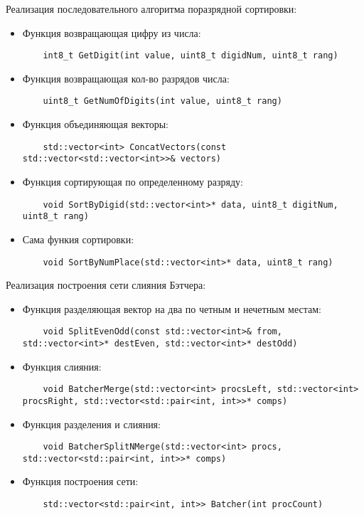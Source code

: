 \documentclass{report}
\begin{document}
Реализация последовательного алгоритма поразрядной сортировки:
\begin{itemize}
\item Функция возвращающая цифру из числа:
\begin{lstlisting}
	int8_t GetDigit(int value, uint8_t digidNum, uint8_t rang)
\end{lstlisting}
\item Функция возвращающая кол-во разрядов числа:
\begin{lstlisting}
	uint8_t GetNumOfDigits(int value, uint8_t rang)
\end{lstlisting}
\item Функция объединяющая векторы:
\begin{lstlisting}
	std::vector<int> ConcatVectors(const std::vector<std::vector<int>>& vectors)
\end{lstlisting}
\item Функция сортирующая по определенному разряду:
\begin{lstlisting}
	void SortByDigid(std::vector<int>* data, uint8_t digitNum, uint8_t rang)
\end{lstlisting}
\item Сама функия сортировки:
\begin{lstlisting}
	void SortByNumPlace(std::vector<int>* data, uint8_t rang)
\end{lstlisting}
\end{itemize}

Реализация построения сети слияния Бэтчера:
\begin{itemize}
\item Функция разделяющая вектор на два по четным и нечетным местам:
\begin{lstlisting}
	void SplitEvenOdd(const std::vector<int>& from, std::vector<int>* destEven, std::vector<int>* destOdd)
\end{lstlisting}
\item Функция слияния:
\begin{lstlisting}
	void BatcherMerge(std::vector<int> procsLeft, std::vector<int> procsRight, std::vector<std::pair<int, int>>* comps)
\end{lstlisting}
\item Функция разделения и слияния:
\begin{lstlisting}
	void BatcherSplitNMerge(std::vector<int> procs, std::vector<std::pair<int, int>>* comps)
\end{lstlisting}
\item Функция построения сети:
\begin{lstlisting}
	std::vector<std::pair<int, int>> Batcher(int procCount)
\end{lstlisting}
\end{itemize}
\end{document}

